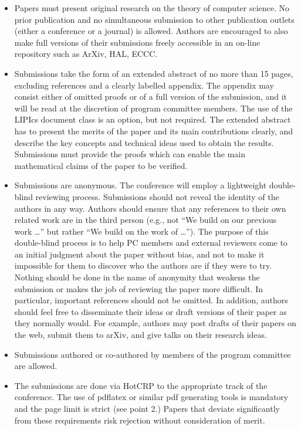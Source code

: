 \documentclass[prodmode,acmtecs]{acmsmall} %
\begin{document}
\begin{itemize}
\begin{itemize}\item   Papers must present original research on the theory of computer science. No prior publication and no simultaneous submission to other publication outlets (either a conference or a journal) is allowed. Authors are encouraged to also make full versions of their submissions freely accessible in an on-line repository such as ArXiv, HAL, ECCC.
\item  Submissions take the form of an extended abstract of no more than 15 pages, excluding references and a clearly labelled appendix. The appendix may consist either of omitted proofs or of a full version of the submission, and it will be read at the discretion of program committee members. The use of the LIPIcs document class is an option, but not required. The extended abstract has to present the merits of the paper and its main contributions clearly, and describe the key concepts and technical ideas used to obtain the results. Submissions must provide the proofs which can enable the main mathematical claims of the paper to be verified.
\item   Submissions are anonymous. The conference will employ a lightweight double-blind reviewing process. Submissions should not reveal the identity of the authors in any way. Authors should ensure that any references to their own related work are in the third person (e.g., not “We build on our previous work …” but rather “We build on the work of …”). The purpose of this double-blind process is to help PC members and external reviewers come to an initial judgment about the paper without bias, and not to make it impossible for them to discover who the authors are if they were to try. Nothing should be done in the name of anonymity that weakens the submission or makes the job of reviewing the paper more difficult. In particular, important references should not be omitted. In addition, authors should feel free to disseminate their ideas or draft versions of their paper as they normally would. For example, authors may post drafts of their papers on the web, submit them to arXiv, and give talks on their research ideas.
\item  Submissions authored or co-authored by members of the program committee are allowed.
\item  The submissions are done via HotCRP to the appropriate track of the conference. The use of pdflatex or similar pdf generating tools is mandatory and the page limit is strict (see point 2.) Papers that deviate significantly from these requirements risk rejection without consideration of merit.

\end{itemize}
\end{itemize}
\end{document}
